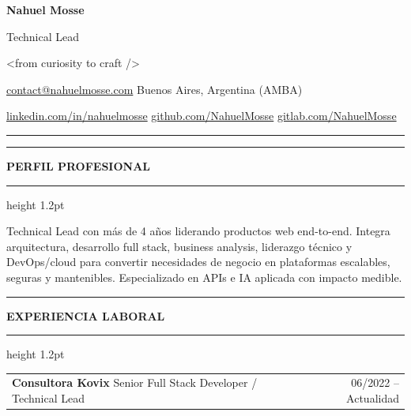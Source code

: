 \documentclass[11pt,letterpaper]{article}
\makeatletter
\newcommand{\cvsection}[1]{%
  \Needspace{4\baselineskip}%
  \vspace{0.55em}%
  \noindent
  {\color{accent}\rule[-0.18em]{3pt}{1.25em}}%
  \hspace{0.45em}%
  {\large\bfseries\color{accentdark}\MakeUppercase{#1}}%
  \hspace{0.55em}%
  {\color{accentlight}\leaders\hrule height 1.2pt\hfill\kern0pt}\par
  \vspace{0.28em}%
}
\newcommand{\cventry}[3]{%
  \begin{tabularx}{\textwidth}{@{}Xr@{}}
    \textbf{\color{accentdark}#1} \textcolor{muted}{\textbar}\enspace #2
    & \small\textcolor{muted}{#3}
  \end{tabularx}
}
\makeatother
\begin{document}
\noindent
\colorbox{forest}{%
  \parbox{\dimexpr\textwidth-2\fboxsep\relax}{%
    \centering
    \vspace{0.7em}
    {\fontsize{27}{30}\selectfont\bfseries\color{cream}Nahuel Mosse}\par
    \vspace{0.12em}
    {\Large\color{cream}Technical Lead}\par
    \vspace{0.18em}
    {\scriptsize\ttfamily\color{gold}%
      \textless from curiosity to craft /\textgreater
    }\par
    \vspace{0.48em}
    {\small\color{cream}%
      \begingroup\hypersetup{urlcolor=cream}%
      \href{mailto:contact@nahuelmosse.com}{contact@nahuelmosse.com}
      \enspace\textbar\enspace
      Buenos Aires, Argentina (AMBA)\par
      \vspace{0.12em}
      \href{https://linkedin.com/in/nahuelmosse}{linkedin.com/in/nahuelmosse}
      \enspace\textbar\enspace
      \href{https://github.com/NahuelMosse}{github.com/NahuelMosse}
      \enspace\textbar\enspace
      \href{https://gitlab.com/NahuelMosse}{gitlab.com/NahuelMosse}%
      \endgroup
    }\par
    \vspace{0.6em}
  }%
}
{\color{cognac}\rule{\textwidth}{1.4pt}}

\cvsection{Perfil profesional}

Technical Lead con más de 4 años liderando productos web end-to-end. Integra
arquitectura, desarrollo full stack, business analysis, liderazgo técnico y DevOps/cloud
para convertir necesidades de negocio en plataformas escalables, seguras y mantenibles.
Especializado en APIs e IA aplicada con impacto medible.

\cvsection{Experiencia laboral}

\cventry{Consultora Kovix}{Senior Full Stack Developer / Technical Lead}{06/2022 -- Actualidad}
\end{document}
